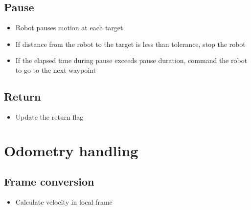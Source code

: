 \documentclass[letterpaper,10pt,english]{sphinxmanual}
\begin{document}
\subsection{Pause}
\label{\detokenize{technical_reference:pause}}\begin{itemize}
\item {} 
\sphinxAtStartPar
Robot pauses motion at each target

\item {} 
\sphinxAtStartPar
If distance from the robot to the target is less than tolerance, stop the robot

\item {} 
\sphinxAtStartPar
If the elapsed time during pause exceeds pause duration, command the robot to go to the next waypoint

\end{itemize}


\subsection{Return}
\label{\detokenize{technical_reference:return}}\begin{itemize}
\item {} 
\sphinxAtStartPar
Update the return flag

\end{itemize}


\section{Odometry handling}
\label{\detokenize{technical_reference:odometry-handling}}

\subsection{Frame conversion}
\label{\detokenize{technical_reference:frame-conversion}}\begin{itemize}
\item {} 
\sphinxAtStartPar
Calculate velocity in local frame

\end{itemize}
\end{document}
